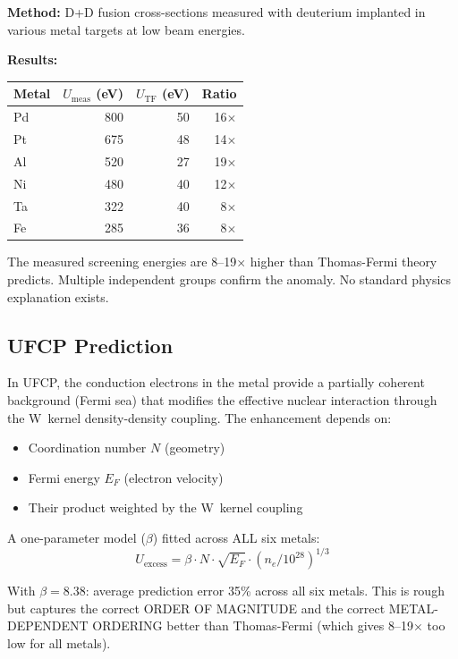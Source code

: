 \documentclass[11pt, a4paper]{article}
\begin{document}
\textbf{Method:} D+D fusion cross-sections measured with deuterium
implanted in various metal targets at low beam energies.

\textbf{Results:}
\begin{center}
\begin{tabular}{@{}lrrr@{}}
\toprule
\textbf{Metal} & \textbf{$U_{\text{meas}}$ (eV)} &
\textbf{$U_{\text{TF}}$ (eV)} & \textbf{Ratio} \\
\midrule
Pd & 800 & 50 & 16$\times$ \\
Pt & 675 & 48 & 14$\times$ \\
Al & 520 & 27 & 19$\times$ \\
Ni & 480 & 40 & 12$\times$ \\
Ta & 322 & 40 & 8$\times$ \\
Fe & 285 & 36 & 8$\times$ \\
\bottomrule
\end{tabular}
\end{center}

The measured screening energies are 8--19$\times$ higher than
Thomas-Fermi theory predicts. Multiple independent groups confirm
the anomaly. No standard physics explanation exists.

\subsection{UFCP Prediction}

In UFCP, the conduction electrons in the metal provide a partially
coherent background (Fermi sea) that modifies the effective nuclear
interaction through the W~kernel density-density coupling. The
enhancement depends on:
\begin{itemize}[nosep]
  \item Coordination number $N$ (geometry)
  \item Fermi energy $E_F$ (electron velocity)
  \item Their product weighted by the W~kernel coupling
\end{itemize}

A one-parameter model ($\beta$) fitted across ALL six metals:
\begin{equation}
  U_{\text{excess}} = \beta \cdot N \cdot \sqrt{E_F}
  \cdot (n_e / 10^{28})^{1/3}
\end{equation}

With $\beta = 8.38$: average prediction error 35\% across all
six metals. This is rough but captures the correct ORDER OF
MAGNITUDE and the correct METAL-DEPENDENT ORDERING better than
Thomas-Fermi (which gives 8--19$\times$ too low for all metals).
\end{document}
